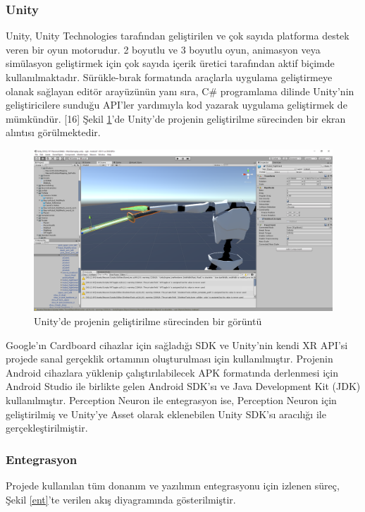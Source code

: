 \documentclass[a4paper, 12pt, titlepage]{article}
\begin{document}
\subsubsection{Unity}
Unity, Unity Technologies tarafından geliştirilen ve çok sayıda platforma destek veren bir oyun
motorudur. 2 boyutlu ve 3 boyutlu oyun, animasyon veya simülasyon geliştirmek için çok sayıda
içerik üretici tarafından aktif biçimde kullanılmaktadır. Sürükle-bırak formatında araçlarla
uygulama geliştirmeye olanak sağlayan editör arayüzünün yanı sıra, C\# programlama dilinde
Unity’nin geliştiricilere sunduğu API’ler yardımıyla kod yazarak uygulama geliştirmek de mümkündür.
[16] Şekil \ref{u}’de Unity’de projenin geliştirilme sürecinden bir ekran alıntısı görülmektedir.

\begin{figure}
    \centering
        \includegraphics[width=6in]{images/u}
    \caption{Unity'de projenin geliştirilme sürecinden bir görüntü}   
    \label{u}
\end{figure}

Google’ın Cardboard cihazlar için sağladığı SDK ve Unity’nin kendi XR API’si projede sanal
gerçeklik ortamının oluşturulması için kullanılmıştır. Projenin Android cihazlara yüklenip
çalıştırılabilecek APK formatında derlenmesi için Android Studio ile birlikte gelen Android SDK’sı
ve Java Development Kit (JDK) kullanılmıştır. Perception Neuron ile entegrasyon ise, Perception
Neuron için geliştirilmiş ve Unity’ye Asset olarak eklenebilen Unity SDK’sı aracılığı ile
gerçekleştirilmiştir.

\subsubsection{Entegrasyon}
Projede kullanılan tüm donanım ve yazılımın entegrasyonu için izlenen süreç, Şekil \ref{ent}’te
verilen akış diyagramında gösterilmiştir.
\end{document}
